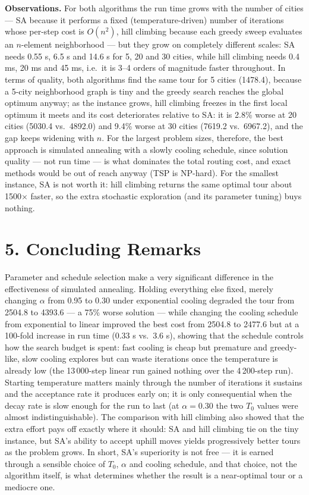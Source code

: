 \documentclass[11pt]{article}
\begin{document}
\textbf{Observations.} For both algorithms the run time grows with the number
of cities --- SA because it performs a fixed (temperature-driven) number of
iterations whose per-step cost is $O(n^2)$, hill climbing because each greedy
sweep evaluates an $n$-element neighborhood --- but they grow on completely
different scales: SA needs 0.55 s, 6.5 s and 14.6 s for 5, 20 and 30 cities,
while hill climbing needs 0.4 ms, 20 ms and 45 ms, i.e.\ it is 3--4 orders of
magnitude faster throughout. In terms of quality, both algorithms find the
same tour for 5 cities (1478.4), because a 5-city neighborhood graph is tiny
and the greedy search reaches the global optimum anyway; as the instance grows,
hill climbing freezes in the first local optimum it meets and its cost
deteriorates relative to SA: it is 2.8\% worse at 20 cities (5030.4 vs.\
4892.0) and 9.4\% worse at 30 cities (7619.2 vs.\ 6967.2), and the gap keeps
widening with $n$. For the largest problem sizes, therefore, the best approach
is simulated annealing with a slowly cooling schedule, since solution quality
--- not run time --- is what dominates the total routing cost, and exact
methods would be out of reach anyway (TSP is NP-hard). For the smallest
instance, SA is not worth it: hill climbing returns the same optimal tour
about 1500$\times$ faster, so the extra stochastic exploration (and its
parameter tuning) buys nothing.

\section*{5. Concluding Remarks}

Parameter and schedule selection make a very significant difference in the
effectiveness of simulated annealing. Holding everything else fixed, merely
changing $\alpha$ from 0.95 to 0.30 under exponential cooling degraded the
tour from 2504.8 to 4393.6 --- a 75\% worse solution --- while changing the
cooling schedule from exponential to linear improved the best cost from 2504.8
to 2477.6 but at a 100-fold increase in run time (0.33 s vs.\ 3.6 s), showing
that the schedule controls how the search budget is spent: fast cooling is
cheap but premature and greedy-like, slow cooling explores but can waste
iterations once the temperature is already low (the 13\,000-step linear run
gained nothing over the 4\,200-step run). Starting temperature matters mainly
through the number of iterations it sustains and the acceptance rate it
produces early on; it is only consequential when the decay rate is slow enough
for the run to last (at $\alpha = 0.30$ the two $T_0$ values were almost
indistinguishable). The comparison with hill climbing also showed that the
extra effort pays off exactly where it should: SA and hill climbing tie on the
tiny instance, but SA's ability to accept uphill moves yields progressively
better tours as the problem grows. In short, SA's superiority is not free ---
it is earned through a sensible choice of $T_0$, $\alpha$ and cooling
schedule, and that choice, not the algorithm itself, is what determines
whether the result is a near-optimal tour or a mediocre one.
\end{document}
